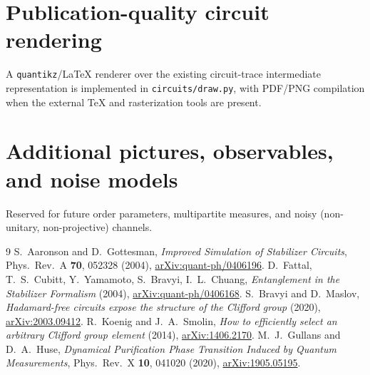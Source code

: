 \documentclass[11pt]{article}
\theoremstyle{definition}
\theoremstyle{plain}
\begin{document}
\section{Publication-quality circuit rendering}
A \texttt{quantikz}/\LaTeX{} renderer over the existing circuit-trace
intermediate representation is implemented in \texttt{circuits/draw.py}, with
PDF/PNG compilation when the external TeX and rasterization tools are present.

\section{Additional pictures, observables, and noise models}
Reserved for future order parameters, multipartite measures, and noisy
(non-unitary, non-projective) channels.

\begin{thebibliography}{9}
 S.~Aaronson and D.~Gottesman, \emph{Improved Simulation of
  Stabilizer Circuits}, Phys.\ Rev.\ A \textbf{70}, 052328 (2004),
  \href{https://arxiv.org/abs/quant-ph/0406196}{arXiv:quant-ph/0406196}.
 D.~Fattal, T.~S.~Cubitt, Y.~Yamamoto, S.~Bravyi, I.~L.~Chuang,
  \emph{Entanglement in the Stabilizer Formalism} (2004),
  \href{https://arxiv.org/abs/quant-ph/0406168}{arXiv:quant-ph/0406168}.
 S.~Bravyi and D.~Maslov, \emph{Hadamard-free circuits expose the
  structure of the Clifford group} (2020),
  \href{https://arxiv.org/abs/2003.09412}{arXiv:2003.09412}.
 R.~Koenig and J.~A.~Smolin, \emph{How to efficiently select an
  arbitrary Clifford group element} (2014),
  \href{https://arxiv.org/abs/1406.2170}{arXiv:1406.2170}.
 M.~J.~Gullans and D.~A.~Huse, \emph{Dynamical Purification Phase
  Transition Induced by Quantum Measurements}, Phys.\ Rev.\ X \textbf{10},
  041020 (2020), \href{https://arxiv.org/abs/1905.05195}{arXiv:1905.05195}.
\end{thebibliography}
\end{document}
